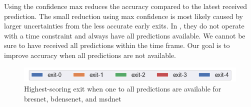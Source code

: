Using the confidence max reduces the accuracy compared to the latest received prediction. The small reduction using max confidence is most likely caused by larger uncertainties from the less accurate early exits. In \cite{kaya_shallow-deep_nodate}, they do not operate with a time constraint and always have all predictions available. We cannot be sure to have received all predictions within the time frame. Our goal is to improve accuracy when all predictions are not available. 
\begin{figure}
	\captionsetup[subfigure]{justification=centering}
	\centering
	\includegraphics[width=.7\linewidth]{figures/edge/exit0-4_legend}
	\hfill
	\hfill
	\caption[Highest Scoring Exit]{Highest-scoring exit when one to all predictions are available for \protect{} \gls{bresnet}, \protect{} \gls{bdensenet}, and \protect{} \gls{msdnet} }
	\label{fig:exit-highscore}
\end{figure}

